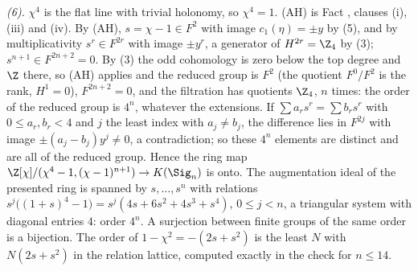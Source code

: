 \emph{(6).} $\chi^{4}$ is the flat line with trivial holonomy, so $\chi^{4} = 1$. (AH) is Fact , clauses (i), (iii) and (iv). By (AH), $s = \chi - 1 \in F^{2}$ with image $c_{1}(\eta) = \pm y$ by (5), and by multiplicativity $s^{r} \in F^{2r}$ with image $\pm y^{r}$, a generator of $H^{2r} = \Z_{4}$ by (3); $s^{n+1} \in F^{2n+2} = 0$. By (3) the odd cohomology is zero below the top degree and $\Z$ there, so (AH) applies and the reduced group is $F^{2}$ (the quotient $F^{0}/F^{2}$ is the rank, $H^{1} = 0$), $F^{2n+2} = 0$, and the filtration has quotients $\Z_{4}$, $n$ times: the order of the reduced group is $4^{n}$, whatever the extensions. If $\sum a_{r}s^{r} = \sum b_{r}s^{r}$ with $0 \leq a_{r}, b_{r} < 4$ and $j$ the least index with $a_{j} \neq b_{j}$, the difference lies in $F^{2j}$ with image $\pm(a_{j} - b_{j})y^{j} \neq 0$, a contradiction; so these $4^{n}$ elements are distinct and are all of the reduced group. Hence the ring map $\Z[\chi]/(\chi^{4} - 1, (\chi - 1)^{n+1}) \to K(\Sig_{n})$ is onto. The augmentation ideal of the presented ring is spanned by $s, \dots, s^{n}$ with relations $s^{j}\bigl((1+s)^{4} - 1\bigr) = s^{j}(4s + 6s^{2} + 4s^{3} + s^{4})$, $0 \leq j < n$, a triangular system with diagonal entries $4$: order $4^{n}$. A surjection between finite groups of the same order is a bijection. The order of $1 - \chi^{2} = -(2s + s^{2})$ is the least $N$ with $N(2s + s^{2})$ in the relation lattice, computed exactly in the check for $n \leq 14$.
